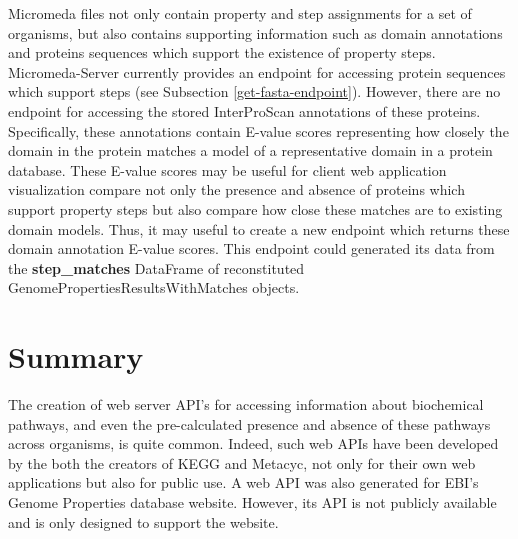 Micromeda files not only contain property and step assignments for a set of organisms, but also contains supporting information such as domain annotations and proteins sequences which support the existence of property steps. Micromeda-Server currently provides an endpoint for accessing protein sequences which support steps (see Subsection \ref{get-fasta-endpoint}). However, there are no endpoint for accessing the stored InterProScan annotations of these proteins. Specifically, these annotations contain E-value scores representing how closely the domain in the protein matches a model of a representative domain in a protein database. These E-value scores may be useful for client web application visualization compare not only the presence and absence of proteins which support property steps but also compare how close these matches are to existing domain models. Thus, it may useful to create a new endpoint which returns these domain annotation E-value scores. This endpoint could generated its data from the \textbf{step_matches} DataFrame of reconstituted GenomePropertiesResultsWithMatches objects. 

\section{Summary}

The creation of web server API's for accessing information about biochemical pathways, and even the pre-calculated presence and absence of these pathways across organisms, is quite common. Indeed, such web APIs have been developed by the both the creators of KEGG and Metacyc, not only for their own web applications but also for public use. A web API was also generated for EBI's Genome Properties database website. However, its API is not publicly available and is only designed to support the website. 